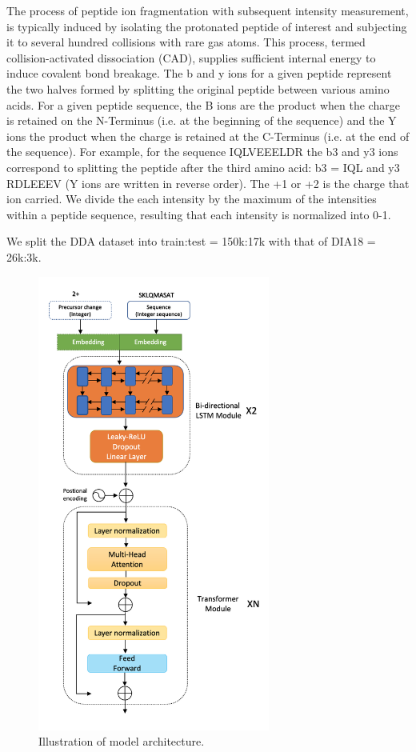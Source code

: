 \documentclass[final]{cvpr}
\begin{document}
The process of peptide ion fragmentation with subsequent intensity measurement, is typically induced by isolating the protonated 
peptide of interest and subjecting it to several hundred collisions with rare gas atoms. 
This process, termed collision-activated dissociation (CAD), supplies sufficient internal energy to induce covalent bond breakage.
The b and y ions for a given peptide represent the two halves formed by splitting the original peptide between various amino acids. For a given peptide sequence, the B 
ions are the product when the charge is retained on the N-Terminus (i.e. at the beginning of the sequence) and the Y ions the product when the charge is retained at 
the C-Terminus (i.e. at the end of the sequence). For example, for the sequence IQLVEEELDR the b3 and y3 ions correspond to splitting the peptide after the third amino
 acid: b3 = IQL and y3 RDLEEEV (Y ions are written in reverse order). The +1 or +2 is the charge that ion carried. We divide the each intensity by the maximum of the intensities 
 within a peptide sequence, resulting that each intensity is normalized into 0-1.

We split the DDA dataset into train:test = 150k:17k with that of DIA18 = 26k:3k.
\begin{figure}[t]

   \includegraphics[width=3.0in]{arch}

   \caption{Illustration of model architecture.}
\label{fig:long}
\label{fig:onecol}
\end{figure}
\end{document}
